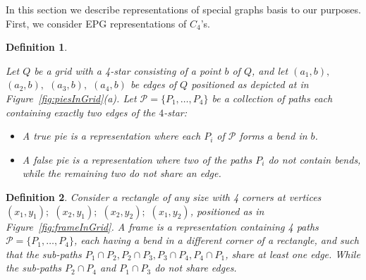 \documentclass[9pt]{entcs}
\newtheorem{defi}{Definition}[section]
\begin{document}

% 

In this section we describe representations of special graphs basis to our purposes. First, we consider EPG representations of $C_4$'s.


\begin{defi} \label{defi:tortasFrame}

Let $ Q $ be a grid with a 4-star consisting of a point $b$ of $Q$,  and let $ (a_1, b),$ $(a_2, b),$ $(a_3, b),$ $(a_4, b)$ be edges of $ Q$ positioned as depicted at in Figure~\ref{fig:piesInGrid}(a). Let $ \mathcal{P} = \{P_1, \dots , P_4\}$ be a collection of paths each containing exactly two edges of the $4$-star:

\begin{itemize}
\item A \emph{true pie} is a representation where each $P_i$ of $ \mathcal{P} $ forms a bend in $b$.

\item A \emph {false pie} is a representation where two of the paths $P_i$ do not contain bends, while the remaining two do not share an edge. 




\end{itemize}
\end{defi}

\begin{defi} \label{defi:tortasFrame2}
 Consider a rectangle of any size with 4 corners at vertices $ (x_1, y_1);$ $(x_2, y_1);$ $(x_2, y_2);$ $(x_1, y_2) $, positioned as in  Figure~\ref{fig:frameInGrid}. A \emph{frame} is a representation containing 4 paths $\mathcal{P} =  \{ P_1, \dots, P_4\} $, each having a bend in a different corner of a rectangle, and such that the  sub-paths $ P_1 \cap P_2, P_2 \cap P_3, P_3 \cap P_4, P_4 \cap P_1 $, share at least one edge. While the sub-paths $ P_2 \cap P_4 $ and $ P_1 \cap P_3 $ do not share edges.



\end{defi}
\end{document}
